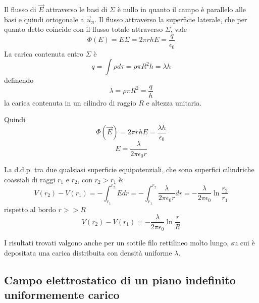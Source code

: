 \documentclass[class=book, crop=false, oneside, 12pt]{standalone}
\begin{document}
Il flusso di \(\overrightarrow{E}\) attraverso le basi di \(\Sigma\) è nullo in quanto il campo è parallelo alle basi e quindi ortogonale a \(\overrightarrow{u}_n\). 
Il flusso attraverso la superficie laterale, che per quanto detto coincide con il flusso totale attraverso \(\Sigma\), vale
\begin{equation*}
    \Phi(E) = E \Sigma = 2 \pi r h E = \frac{q}{\epsilon_0}
\end{equation*} 
La carica contenuta entro \(\Sigma\) è 
\begin{equation*}
    q = \int \rho d \tau = \rho \pi R^2 h = \lambda h
\end{equation*}
definendo
\begin{equation*}
    \lambda = \rho \pi R^2 = \frac{q}{h}
\end{equation*}
la carica contenuta in un cilindro di raggio \(R\) e altezza unitaria.

Quindi
\begin{equation*}
    \Phi(\overrightarrow{E}) = 2 \pi r h E = \frac{\lambda h}{\epsilon_0} 
\end{equation*}
\begin{equation*}
    E = \frac{\lambda}{2 \pi \epsilon_0 r}
\end{equation*}

La d.d.p. tra due qualsiasi superficie equipotenziali, che sono superfici cilindriche coassiali di raggi \(r_1\) e \(r_2\), con \(r_2 > r_1\) è: 
\begin{equation*}
    V(r_2) - V(r_1) = - \int_{r_1}^{r_2} E d r = - \int_{r_1}^{r_2} \frac{\lambda}{2 \pi \epsilon_0 r} d r = - \frac{\lambda}{2 \pi \epsilon_0} \ln \frac{r_2}{r_1}
\end{equation*}
rispetto al bordo \(r >> R\)
\begin{equation*}
    V(r_2) - V(r_1) = - \frac{\lambda}{2 \pi \epsilon_0} \ln \frac{r}{R}
\end{equation*}

I risultati trovati valgono anche per un sottile filo rettilineo molto lungo, su cui è depositata una carica distribuita con densità uniforme \(\lambda\).

\subsection{Campo elettrostatico di un piano indefinito uniformemente carico}
\end{document}
